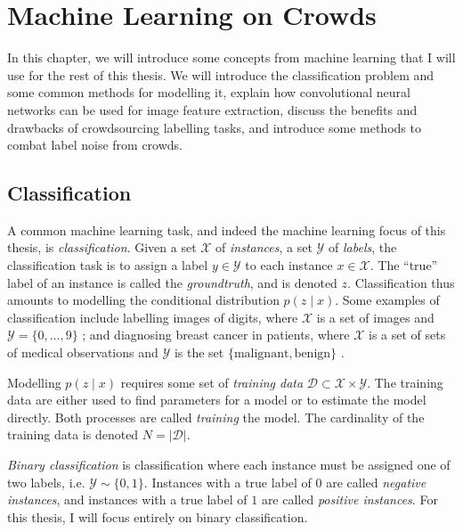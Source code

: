 \chapter{Machine Learning on Crowds}
\label{cha:ml}

In this chapter, we will introduce some concepts from machine learning that I
will use for the rest of this thesis. We will introduce the classification
problem and some common methods for modelling it, explain how convolutional
neural networks can be used for image feature extraction, discuss the benefits
and drawbacks of crowdsourcing labelling tasks, and introduce some methods to
combat label noise from crowds.

\section{Classification}
\label{sec:classification}
    
    A common machine learning task, and indeed the machine learning focus of
    this thesis, is \emph{classification}. Given a set $\mathcal X$ of
    \emph{instances}, a set $\mathcal Y$ of \emph{labels}, the classification
    task is to assign a label $y \in \mathcal Y$ to each instance $x \in
    \mathcal X$. The ``true'' label of an instance is called the
    \emph{groundtruth}, and is denoted $z$. Classification thus amounts to
    modelling the conditional distribution $p(z \mid x)$. Some examples of
    classification include labelling images of digits, where $\mathcal X$ is a
    set of images and $\mathcal Y = \{0, \dots, 9\}$ \citep{lecun98}; and
    diagnosing breast cancer in patients, where $\mathcal X$ is a set of sets
    of medical observations and $\mathcal Y$ is the set $\{\text{malignant},
    \text{benign}\}$ \citep{wolberg90}.

    Modelling $p(z \mid x)$ requires some set of \emph{training data} $\mathcal
    D \subset \mathcal X \times \mathcal Y$. The training data are either used
    to find parameters for a model or to estimate the model directly. Both
    processes are called \emph{training} the model. The cardinality of the
    training data is denoted $N = |\mathcal D|$.

    \emph{Binary classification} is classification where each instance must be
    assigned one of two labels, i.e. $\mathcal Y \sim \{0, 1\}$. Instances with
    a true label of $0$ are called \emph{negative instances}, and instances
    with a true label of $1$ are called \emph{positive instances}. For this
    thesis, I will focus entirely on binary classification.


